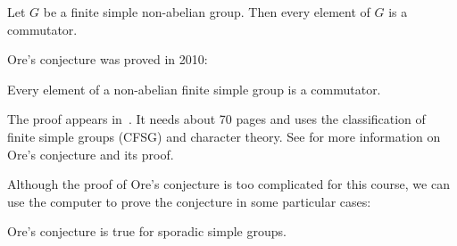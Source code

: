 \begin{conjecture}[Ore]
\label{conjecture:Ore}
    Let $G$ be a finite simple non-abelian group. 
    Then every element of $G$ is a commutator. 
\end{conjecture}

Ore's conjecture was proved in 2010:

\begin{theorem}
    Every element of a non-abelian finite simple group is a commutator.     
\end{theorem}

The proof appears in~\cite{MR2654085}. It needs about 70 pages and
uses the classification of finite simple groups (CFSG) and character theory.
See \cite{MR3289286} for more information on Ore's conjecture and its proof. 

Although the proof of Ore's conjecture is too complicated for 
this course, we can use the computer to 
prove the conjecture in some particular cases:

\begin{proposition}
    Ore's conjecture is true 
    for sporadic simple groups.
\end{proposition}








